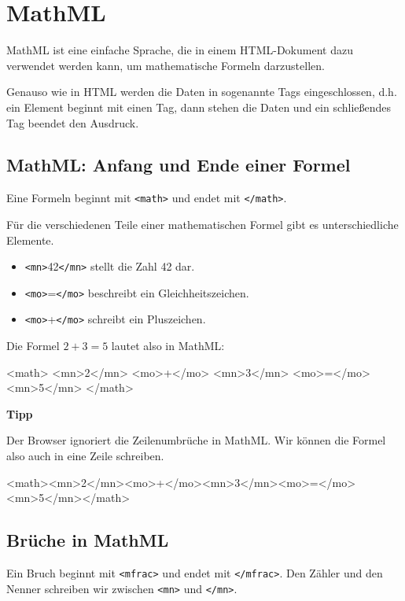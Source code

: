 \section{MathML}

MathML ist eine einfache Sprache, die in einem HTML-Dokument dazu verwendet werden kann, um mathematische Formeln darzustellen.

Genauso wie in HTML werden die Daten in sogenannte Tags eingeschlossen, d.h. ein Element beginnt mit einen Tag, dann stehen die Daten und ein schließendes Tag beendet den Ausdruck. 

\subsection{MathML: Anfang und Ende einer Formel}

Eine Formeln beginnt mit \texttt{<math>} und endet mit \texttt{</math>}.

Für die verschiedenen Teile einer mathematischen Formel gibt es unterschiedliche Elemente.
\begin{itemize}
	\item \texttt{<mn>}42\texttt{</mn>} stellt die Zahl 42 dar.
	\item \texttt{<mo>}=\texttt{</mo>} beschreibt ein Gleichheitszeichen.
	\item \texttt{<mo>}+\texttt{</mo>} schreibt ein Pluszeichen.
\end{itemize}

Die Formel $2 + 3 = 5$ lautet also in MathML:

\begin{codeHTML}
<math>
	<mn>2</mn>
	<mo>+</mo>
	<mn>3</mn>
	<mo>=</mo>
	<mn>5</mn>
</math>
\end{codeHTML}

\textbf{Tipp}

Der Browser ignoriert die Zeilenumbrüche in MathML. Wir können die Formel also auch in eine Zeile schreiben.

\begin{codeHTML}
<math><mn>2</mn><mo>+</mo><mn>3</mn><mo>=</mo><mn>5</mn></math>
\end{codeHTML}

\subsection{Brüche in MathML}

Ein Bruch beginnt mit \texttt{<mfrac>} und endet mit \texttt{</mfrac>}. Den Zähler und den Nenner schreiben wir zwischen \texttt{<mn>} und \texttt{</mn>}.

